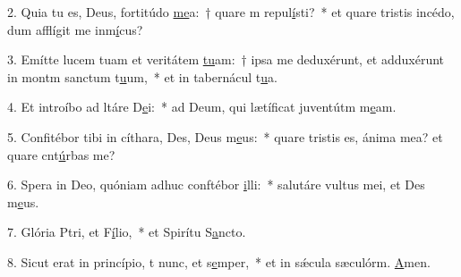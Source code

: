 2. Quia tu es, Deus, fortitúdo \uline{me}a:~† quare m repul\uline{í}sti?~* et quare tristis incédo, dum afflígit me inm\uline{í}cus?\par 
3. Emítte lucem tuam et veritátem \uline{tu}am:~† ipsa me deduxérunt, et adduxérunt in montm sanctum t\uline{u}um,~* et in tabernácul t\uline{u}a.\par 
4. Et introíbo ad ltáre D\uline{e}i:~* ad Deum, qui lætíficat juventútm m\uline{e}am.\par 
5. Confitébor tibi in cíthara, Des, Deus m\uline{e}us:~* quare tristis es, ánima mea? et quare cnt\uline{ú}rbas me?\par 
6. Spera in Deo, quóniam adhuc conftébor \uline{i}lli:~* salutáre vultus mei, et Des m\uline{e}us.\par 
7. Glória Ptri, et F\uline{í}lio,~* et Spirítu S\uline{a}ncto.\par 
8. Sicut erat in princípio, t nunc, et s\uline{e}mper,~* et in sǽcula sæculórm. \uline{A}men.\par 
